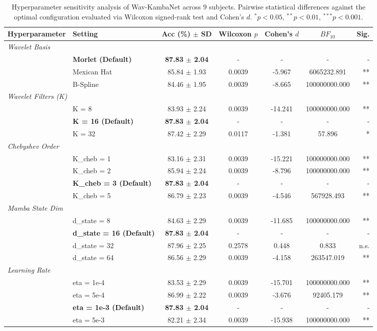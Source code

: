 \begin{table}[t]
\centering
\small
\caption{Hyperparameter sensitivity analysis of Wav-KambaNet across 9 subjects. Pairwise statistical differences against the optimal configuration evaluated via Wilcoxon signed-rank test and Cohen's $d$. $^{*}p < 0.05$, $^{**}p < 0.01$, $^{***}p < 0.001$.}
\label{tab:wavkamba_sensitivity}
\begin{tabular}{llccccr}
\toprule
\textbf{Hyperparameter} & \textbf{Setting} & \textbf{Acc (\%) $\pm$ SD} & \textbf{Wilcoxon $p$} & \textbf{Cohen's $d$} & \textbf{$BF_{10}$} & \textbf{Sig.} \\
\midrule
\multicolumn{7}{l}{\textit{Wavelet Basis}} \\
  & \textbf{Morlet (Default)} & \textbf{87.83 $\pm$ 2.04} & - & - & - & - \\
  & Mexican Hat & 85.84 $\pm$ 1.93 & 0.0039 & -5.967 & 6065232.891 & ** \\
  & B-Spline & 84.46 $\pm$ 1.95 & 0.0039 & -8.665 & 100000000.000 & ** \\
\midrule
\multicolumn{7}{l}{\textit{Wavelet Filters (K)}} \\
  & K = 8 & 83.93 $\pm$ 2.24 & 0.0039 & -14.241 & 100000000.000 & ** \\
  & \textbf{K = 16 (Default)} & \textbf{87.83 $\pm$ 2.04} & - & - & - & - \\
  & K = 32 & 87.42 $\pm$ 2.29 & 0.0117 & -1.381 & 57.896 & * \\
\midrule
\multicolumn{7}{l}{\textit{Chebyshev Order}} \\
  & K_cheb = 1 & 83.16 $\pm$ 2.31 & 0.0039 & -15.221 & 100000000.000 & ** \\
  & K_cheb = 2 & 85.94 $\pm$ 2.24 & 0.0039 & -8.796 & 100000000.000 & ** \\
  & \textbf{K_cheb = 3 (Default)} & \textbf{87.83 $\pm$ 2.04} & - & - & - & - \\
  & K_cheb = 5 & 86.79 $\pm$ 2.23 & 0.0039 & -4.546 & 567928.493 & ** \\
\midrule
\multicolumn{7}{l}{\textit{Mamba State Dim}} \\
  & d_state = 8 & 84.63 $\pm$ 2.29 & 0.0039 & -11.685 & 100000000.000 & ** \\
  & \textbf{d_state = 16 (Default)} & \textbf{87.83 $\pm$ 2.04} & - & - & - & - \\
  & d_state = 32 & 87.96 $\pm$ 2.25 & 0.2578 & 0.448 & 0.833 & n.s. \\
  & d_state = 64 & 86.56 $\pm$ 2.29 & 0.0039 & -4.158 & 263547.019 & ** \\
\midrule
\multicolumn{7}{l}{\textit{Learning Rate}} \\
  & eta = 1e-4 & 83.53 $\pm$ 2.29 & 0.0039 & -15.701 & 100000000.000 & ** \\
  & eta = 5e-4 & 86.99 $\pm$ 2.22 & 0.0039 & -3.676 & 92405.179 & ** \\
  & \textbf{eta = 1e-3 (Default)} & \textbf{87.83 $\pm$ 2.04} & - & - & - & - \\
  & eta = 5e-3 & 82.21 $\pm$ 2.34 & 0.0039 & -15.938 & 100000000.000 & ** \\
\bottomrule
\end{tabular}
\end{table}
